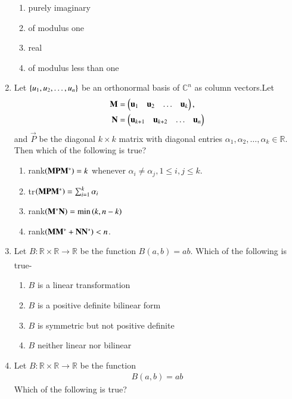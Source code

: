 \begin{enumerate}[label=\thesection.\arabic*.,ref=\thesection.\theenumi]
\begin{enumerate}
\item purely imaginary
\item of modulus one
\item real
\item of modulus less than one
\end{enumerate}  
%
\solution

\item Let $\left\{u_1,u_2,\dots, u_n\right\}$ be an orthonormal basis of $\mathbb{C}^n$ as column vectors.Let 
\begin{align}
\mathbf{M} &= \begin{pmatrix}\mathbf{u}_1 & \mathbf{u}_2 & \dots & \mathbf{u}_k\end{pmatrix},
\\
\mathbf{N} &= \begin{pmatrix}\mathbf{u}_{k+1} & \mathbf{u}_{k+2} & \dots & \mathbf{u}_n\end{pmatrix}
\end{align}
%
and $\vec{P}$ be the diagonal $k \times k$ matrix with diagonal entries $\alpha_1,\alpha_2, \dots, \alpha_k \in \mathbb{R}$.  Then which of the following is true?
\begin{enumerate}
\item rank$\left(\mathbf{M}\mathbf{P}\mathbf{M}^*\right) = k$ whenever $\alpha_i \ne \alpha_j, 1 \le i, j \le k$.
\item tr$\left(\mathbf{M}\mathbf{P}\mathbf{M}^*\right) = \sum_{i=1}^{k}\alpha_i$
\item rank$\left(\mathbf{M}^*\mathbf{N}\right) = \min\left(k,n-k\right)$
\item rank$\left(\mathbf{M}\mathbf{M}^*+\mathbf{N}\mathbf{N}^*\right)  < n$.
\end{enumerate}  
%
\solution

\item Let $B: \mathbb{R} \times \mathbb{R} \xrightarrow[]{} \mathbb{R}$ be the function $B(a,b) = ab$. Which of the following is true-
\begin{enumerate}
\item{$B$ is a linear transformation}
\item{$B$ is a positive definite bilinear form}
\item{$B$ is symmetric but not positive definite}
\item{$B$ neither linear nor bilinear}
\end{enumerate}
%
\solution

\item Let $B: \mathbb{R} \times \mathbb{R} \to \mathbb{R}$ be the function
\begin{align}
B(a,b) = ab
\end{align}
Which of the following is true?
\begin{enumerate}

\end{enumerate}
\end{enumerate}
